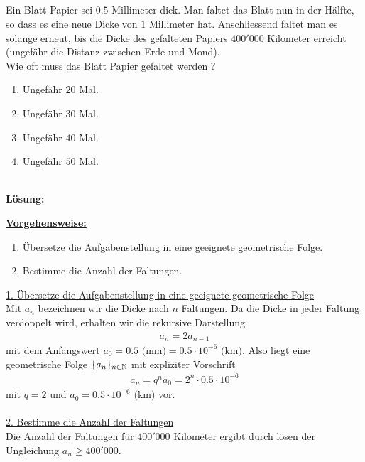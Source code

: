 \newpage
\subsection*{}
Ein Blatt Papier sei $ 0.5 $ Millimeter dick. Man faltet das Blatt nun in der Hälfte, so dass es eine neue Dicke von $ 1 $ Millimeter hat.
Anschliessend faltet man es solange erneut, bis die Dicke des gefalteten Papiers $ 400'000 $ Kilometer erreicht (ungefähr die Distanz zwischen Erde und Mond).\\
Wie oft muss das Blatt Papier gefaltet werden ? 
\renewcommand{\labelenumi}{(\alph{enumi})}
\begin{enumerate}
	\item 
	Ungefähr $ 20 $ Mal.
	\item
	Ungefähr $ 30 $ Mal.
	\item
	Ungefähr $ 40 $ Mal.
	\item
	Ungefähr $ 50 $ Mal.
\end{enumerate}
\ \\
\textbf{Lösung:}
\begin{mdframed}
\underline{\textbf{Vorgehensweise:}}
\renewcommand{\labelenumi}{\theenumi.}
\begin{enumerate}
\item Übersetze die Aufgabenstellung in eine geeignete geometrische Folge.
\item Bestimme die Anzahl der Faltungen.
\end{enumerate}
\end{mdframed}
\underline{1. Übersetze die Aufgabenstellung in eine geeignete geometrische Folge}\\
Mit $ a_n $ bezeichnen wir die Dicke nach $ n $ Faltungen. Da die Dicke in jeder Faltung verdoppelt wird, erhalten wir die rekursive Darstellung
\begin{align*}
	a_n = 2 a_{n-1}
\end{align*}
mit dem Anfangswert $ a_0 = 0.5 \textrm{ (mm)} = 0.5 \cdot 10^{-6} \textrm{ (km)} $.
Also liegt eine geometrische Folge $ \{a_n\}_{n \in \mathbb{N}} $ mit expliziter Vorschrift
\begin{align*}
	a_n = q^n a_0 = 2^n \cdot  0.5 \cdot  10^{-6}
\end{align*}
mit $ q = 2 $ und $ a_0 = 0.5 \cdot  10^{-6} \textrm{ (km)} $ vor.\\
\\
\underline{2. Bestimme die Anzahl der Faltungen}\\
Die Anzahl der Faltungen für $ 400'000 $ Kilometer ergibt durch lösen der Ungleichung $ a_n \geq 400'000 $.
